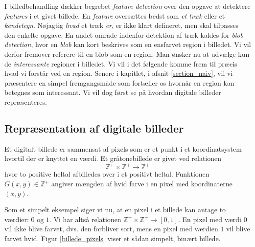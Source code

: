 {
{\sffamily I billedbehandling dækker begrebet \emph{feature detection}
over den opgave at detektere \emph{features} i et givet billede. En
\emph{feature} oversættes bedst som \emph{et træk} eller et
\emph{kendetegn}. Nøjagtig \emph{hvad} et træk \emph{er}, er ikke klart
defineret, men skal tilpasses den enkelte opgave. En andet område
indenfor detektion af træk kaldes for \emph{blob detection}, hvor en
\emph{blob} kan kort beskrives som en ensfarvet region i billedet. Vi
vil derfor fremover referere til en blob som en region. Man ønsker nu at
udvælge kun de \emph{interessante} regioner i billedet. Vi vil i det
følgende komme frem til præcis hvad vi forstår ved en region. Senere i
kapitlet, i afsnit \ref{section_naiv}, vil vi præsentere en simpel
fremgangsmåde som fortæller os hvornår en region kan betegnes som
interessant. Vi vil dog først se på hvordan digitale billeder
repræsenteres.
}

\subsection{Repræsentation af digitale billeder}
Et digitalt billede er sammensat af pixels som er et punkt i et
koordinatsystem hvortil der er knyttet en værdi. Et gråtonebillede er
givet ved relationen
\begin{equation}
    \mathbb{Z}^{+}\times{} \mathbb{Z}^{+} \rightarrow \mathbb{Z}^{+}
\end{equation}
hvor to positive heltal afbilledes over i et positivt heltal.
Funktionen $G(x, y) \in \mathbb{Z}^{+}$ angiver mængden af hvid farve i
en pixel med koordinaterne $(x, y)$.

Som et simpelt eksempel siger vi nu, at en pixel i et billede kan antage
to værdier: $0$ og $1$. Vi har altså relationen $\mathbb{Z}^{+}\times{}
\mathbb{Z}^{+} \rightarrow [0, 1]$. En pixel med værdi $0$ vil ikke
blive farvet, dvs. den forbliver sort, mens en pixel med værdien $1$ vil
blive farvet hvid.  Figur \ref{billede_pixels} viser et sådan simpelt,
binært billede.

}
